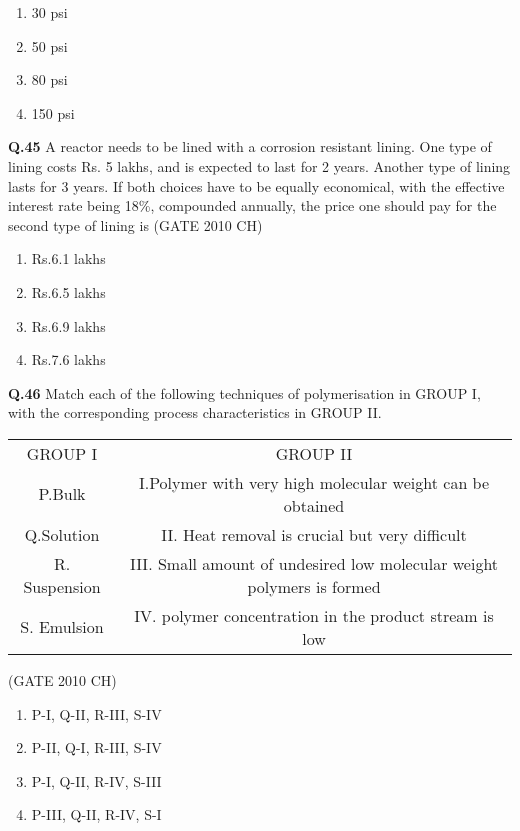 \documentclass[journal,12pt,onecolumn]{exam}
\theoremstyle{remark}
\begin{document}
    \begin{enumerate}
        \item 30 psi
        \item 50 psi
        \item 80 psi
        \item 150 psi
    \end{enumerate}

   \noindent
   \textbf{Q.45}
   A reactor needs to be lined with a corrosion resistant lining. One type of lining costs Rs. 5 lakhs, and is expected to last for 2 years. Another type of lining lasts for 3 years. If both choices have to be equally economical, with the effective interest rate being 18\%, compounded annually, the price one should pay for the second type of lining is
   \hfill{(GATE 2010 CH)}\\

   \begin{enumerate}
       \item Rs.6.1 lakhs
       \item Rs.6.5 lakhs
       \item Rs.6.9 lakhs
       \item Rs.7.6 lakhs
   \end{enumerate}


\noindent
\textbf{Q.46}
Match each of the following techniques of polymerisation in GROUP I, with the corresponding process characteristics in GROUP II.

  
      \begin{tabular}{c|c}
       GROUP I  & GROUP II \\
       P.Bulk    & I.Polymer with very high molecular weight can be obtained\\
       Q.Solution & II. Heat removal is crucial but very difficult\\
       R. Suspension & III. Small amount of undesired low molecular weight polymers is formed\\
       S. Emulsion & IV. polymer concentration in the product stream is low
      \end{tabular}
      
 \hfill{(GATE 2010 CH)}\\


\begin{enumerate}
    \item P-I, Q-II, R-III, S-IV
    \item P-II, Q-I, R-III, S-IV
    \item P-I, Q-II, R-IV, S-III
    \item P-III, Q-II, R-IV, S-I
\end{enumerate}
\end{document}
